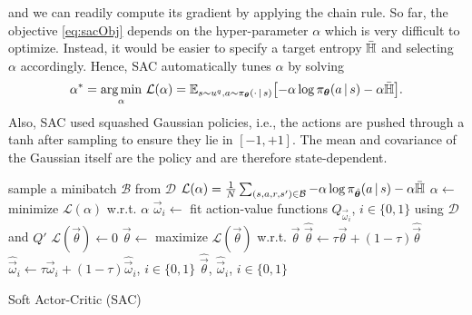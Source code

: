 			and we can readily compute its gradient by applying the chain rule. So far, the objective \eqref{eq:sacObj} depends on the hyper-parameter \(\alpha\) which is very difficult to optimize. Instead, it would be easier to specify a target entropy \(\bar{\mathbb{H}}\) and selecting \(\alpha\) accordingly. Hence, \ac{SAC} automatically tunes \(\alpha\) by solving
			\begin{equation}
				\alpha^\ast = \operatorname*{arg\,min}_\alpha \, \mathcal{L}(\alpha) = \mathbb{E}_{s \sim u^q, a \sim \pi_{\bm{\theta}}(\cdot \,\vert\, s)}\bigl[ -\alpha \log \pi_{\bm{\theta}}(a \,\vert\, s) - \alpha \bar{\mathbb{H}} \bigr].
			\end{equation}
			Also, \ac{SAC} used squashed Gaussian policies, i.e., the actions are pushed through a tanh after sampling to ensure they lie in \([-1, +1]\). The mean and covariance of the Gaussian itself are the policy and are therefore state-dependent.

			\begin{algorithm}  \DontPrintSemicolon
				sample a minibatch \(\mathcal{B}\) from \(\mathcal{D}\) \;
				\( \mathcal{L}(\alpha) = \frac{1}{N} \sum_{(s, a, r, s') \in \mathcal{B}} - \alpha \log \pi_{\hat{\bm{\theta}}}(a \,\vert\, s) - \alpha \bar{\mathbb{H}} \) \;
				\( \alpha \gets \) minimize \(\mathcal{L}(\alpha)\) w.r.t. \(\alpha\) \;
				\( \vec{\omega}_i \gets \) fit action-value functions \(Q_{\vec{\omega}_i}\), \( i \in \{ 0, 1 \} \) using \(\mathcal{D}\) and \(Q'\) \;
				\( \mathcal{L}(\vec{\theta}) \gets 0 \) \;
				\( \vec{\theta} \gets \) maximize \(\mathcal{L}(\vec{\theta})\) w.r.t. \(\vec{\theta}\) \;
				\( \hat{\vec{\theta}} \gets \tau \vec{\theta} + (1 - \tau) \hat{\vec{\theta}} \) \;
				\( \hat{\vec{\omega}}_i \gets \tau \vec{\omega}_i + (1 - \tau) \hat{\vec{\omega}}_i \), \( i \in \{ 0, 1 \} \) \;
				\Return \(\hat{\vec{\theta}}\), \(\hat{\vec{\omega}}_i\), \( i \in \{ 0, 1 \} \) \;
				\caption{Soft Actor-Critic (\acs{SAC})}
				\label{alg:sac}
			\end{algorithm}

